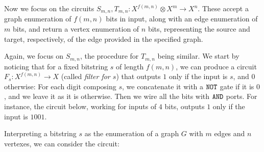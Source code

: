Now we focus on the circuits $S_{m,n}, T_{m,n}: X^{f(m,n)} \otimes X^m \to X^n $.
These accept a graph enumeration of $f(m,n)$ bits in input, along with an edge 
enumeration of $m$ bits, and return a vertex enumeration of $n$ bits, representing the 
source and target, respectively, of the edge provided in the specified graph.

Again, we focus on $S_{m,n}$, the procedure for $T_{m,n}$ being
similar. We start by noticing that for a fixed
bitstring $s$ of length $f(m,n)$, we can produce a circuit 
$F_s: X^{f(m,n)} \to X$ (called \emph{filter for $s$}) that outputs $1$ only 
if the input is $s$, and $0$ otherwise: For each digit composing 
$s$, we concatenate it with a $\texttt{NOT}$ gate if it is $0$, and we leave it as it is 
otherwise. Then we wire all the bits with $\texttt{AND}$ ports. For instance, 
the circuit below, working for inputs of $4$ bits, 
outputs $1$ only if the input is $1001$.
%
%
\begin{center}
\end{center}
%
Interpreting a bitstring $s$ as the enumeration of a 
graph $G$ with $m$ edges and $n$ vertexes, we can consider the circuit:
%
%
